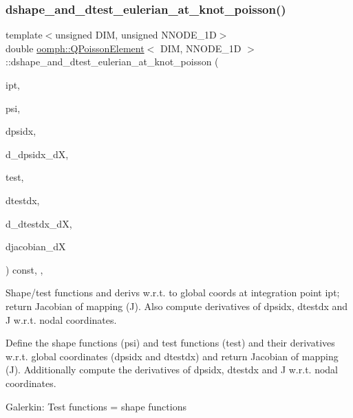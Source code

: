 \subsubsection{\texorpdfstring{dshape\+\_\+and\+\_\+dtest\+\_\+eulerian\+\_\+at\+\_\+knot\+\_\+poisson()}{dshape\_and\_dtest\_eulerian\_at\_knot\_poisson()}\hspace{0.1cm}{\footnotesize\ttfamily [2/2]}}
{\footnotesize\ttfamily template$<$unsigned D\+IM, unsigned N\+N\+O\+D\+E\+\_\+1D$>$ \\
double \hyperlink{classoomph_1_1QPoissonElement}{oomph\+::\+Q\+Poisson\+Element}$<$ D\+IM, N\+N\+O\+D\+E\+\_\+1D $>$\+::dshape\+\_\+and\+\_\+dtest\+\_\+eulerian\+\_\+at\+\_\+knot\+\_\+poisson (\begin{DoxyParamCaption}\item[{const unsigned \&}]{ipt,  }\item[{\hyperlink{classoomph_1_1Shape}{Shape} \&}]{psi,  }\item[{\hyperlink{classoomph_1_1DShape}{D\+Shape} \&}]{dpsidx,  }\item[{\hyperlink{classoomph_1_1RankFourTensor}{Rank\+Four\+Tensor}$<$ double $>$ \&}]{d\+\_\+dpsidx\+\_\+dX,  }\item[{\hyperlink{classoomph_1_1Shape}{Shape} \&}]{test,  }\item[{\hyperlink{classoomph_1_1DShape}{D\+Shape} \&}]{dtestdx,  }\item[{\hyperlink{classoomph_1_1RankFourTensor}{Rank\+Four\+Tensor}$<$ double $>$ \&}]{d\+\_\+dtestdx\+\_\+dX,  }\item[{\hyperlink{classoomph_1_1DenseMatrix}{Dense\+Matrix}$<$ double $>$ \&}]{djacobian\+\_\+dX }\end{DoxyParamCaption}) const\hspace{0.3cm}{\ttfamily [inline]}, {\ttfamily [protected]}, {\ttfamily [virtual]}}



Shape/test functions and derivs w.\+r.\+t. to global coords at integration point ipt; return Jacobian of mapping (J). Also compute derivatives of dpsidx, dtestdx and J w.\+r.\+t. nodal coordinates. 

Define the shape functions (psi) and test functions (test) and their derivatives w.\+r.\+t. global coordinates (dpsidx and dtestdx) and return Jacobian of mapping (J). Additionally compute the derivatives of dpsidx, dtestdx and J w.\+r.\+t. nodal coordinates.

Galerkin\+: Test functions = shape functions 

